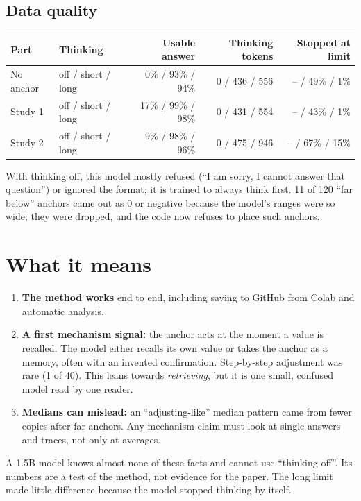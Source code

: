 \documentclass[11pt,a4paper]{article}
\begin{document}
\subsection{Data quality}
\begin{center}\small
\begin{tabular}{@{}llrrr@{}}
\toprule
Part & Thinking & Usable answer & Thinking tokens & Stopped at limit \\
\midrule
No anchor & off / short / long & 0\% / 93\% / 94\% & 0 / 436 / 556 & -- / 49\% / 1\% \\
Study 1 & off / short / long & 17\% / 99\% / 98\% & 0 / 431 / 554 & -- / 43\% / 1\% \\
Study 2 & off / short / long & 9\% / 98\% / 96\% & 0 / 475 / 946 & -- / 67\% / 15\% \\
\bottomrule
\end{tabular}
\end{center}
With thinking off, this model mostly refused (\enquote{I am sorry, I cannot answer that question}) or ignored the format; it is trained to always think first. 11 of 120 \enquote{far below} anchors came out as 0 or negative because the model's ranges were so wide; they were dropped, and the code now refuses to place such anchors.

\section{What it means}
\begin{enumerate}[leftmargin=*]
  \item \textbf{The method works} end to end, including saving to GitHub from Colab and automatic analysis.
  \item \textbf{A first mechanism signal:} the anchor acts at the moment a value is recalled. The model either recalls its own value or takes the anchor as a memory, often with an invented confirmation. Step-by-step adjustment was rare (1 of 40). This leans towards \emph{retrieving}, but it is one small, confused model read by one reader.
  \item \textbf{Medians can mislead:} an \enquote{adjusting-like} median pattern came from fewer copies after far anchors. Any mechanism claim must look at single answers and traces, not only at averages.
\end{enumerate}

\begin{cautionbox}[Limits.]
A 1.5B model knows almost none of these facts and cannot use \enquote{thinking off}. Its numbers are a test of the method, not evidence for the paper. The long limit made little difference because the model stopped thinking by itself.
\end{cautionbox}
\end{document}
